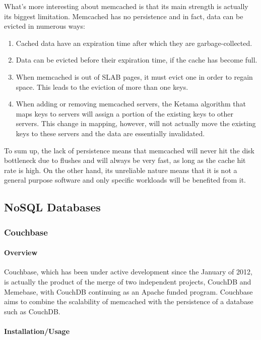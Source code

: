 What's more interesting about memcached is that its main strength is actually 
its biggest limitation. Memcached has no persistence and in fact, data can be 
evicted in numerous ways:

\begin{enumerate}
	\item Cached data have an expiration time after which they are 
		garbage-collected.
	\item Data can be evicted before their expiration time, if the cache has 
		become full.
	\item When memcached is out of SLAB pages, it must evict one in order to 
		regain space. This leads to the eviction of more than one keys.
	\item When adding or removing memcached servers, the Ketama algorithm that 
		maps keys to servers will assign a portion of the existing keys to 
		other servers. This change in mapping, however, will not actually move 
		the existing keys to these servers and the data are essentially 
		invalidated.
\end{enumerate}

To sum up, the lack of persistence means that memcached will never hit the disk 
bottleneck due to flushes and will always be very fast, as long as the cache 
hit rate is high. On the other hand, its unreliable nature means that it is not 
a general purpose software and only specific workloads will be benefited from 
it.

\subsection{NoSQL Databases}

\subsubsection{Couchbase}

\paragraph{Overview}

Couchbase, which has been under active development since the January of 2012, 
is actually the product of the merge of two independent projects, CouchDB and 
Memebase, with CouchDB continuing as an Apache funded program. Couchbase aims 
to combine the scalability of memcached with the persistence of a database such 
as CouchDB. 

\paragraph{Installation/Usage}

